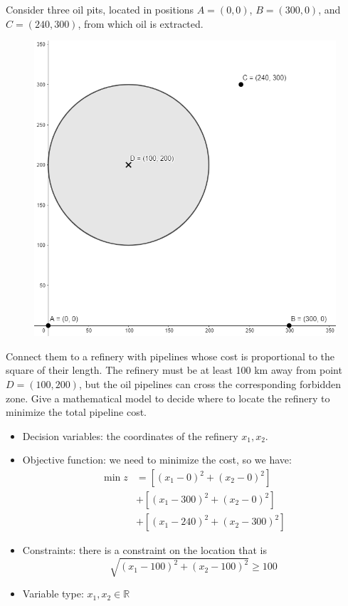 \documentclass[12pt, a4paper]{report}
\newtheorem[style=M,bodystyle=\normalfont]{proposition}{Proposition}
\newtheorem[style=M,bodystyle=\normalfont]{theorem}{Theorem}
\newtheorem[style=M,bodystyle=\normalfont]{corollary}{Corollary}
\newtheorem[style=M,bodystyle=\normalfont]{lemma}{Lemma}
\newtheorem[style=M,bodystyle=\normalfont]{definition}{Definition}
\begin{document}
    \begin{example}
        Consider three oil pits, located in positions $A=(0,0)$, $B=(300,0)$, and $C=(240,300)$, from which oil is extracted. 
        \begin{figure}[H]
            \centering
            \includegraphics[width=0.4\linewidth]{images/example3.png}
        \end{figure}
        Connect them to a refinery with pipelines whose cost is proportional to the square of their length. The refinery must be at least 100 km away from point $D=(100,200)$, but 
        the oil pipelines can cross the corresponding forbidden zone. Give a mathematical model to decide where to locate the refinery to minimize the total pipeline cost. 
        \begin{itemize}
            \item Decision variables: the coordinates of the refinery $x_1,x_2$. 
            \item Objective function: we need to minimize the cost, so we have: 
            \begin{align*}
                \min{z} &=\left[ (x_1-0)^2+(x_2-0)^2 \right] \\
                        &+ \left[ (x_1-300)^2+(x_2-0)^2 \right] \\
                        &+ \left[ (x_1-240)^2+(x_2-300)^2 \right] 
            \end{align*}
            \item Constraints: there is a constraint on the location that is
                \[\sqrt{{\left( x_1-100 \right)}^2+{\left( x_2-100 \right)}^2} \geq 100\]
            \item Variable type: $x_1,x_2 \in \mathbb{R}$
        \end{itemize}
    \end{example}
\end{document}

